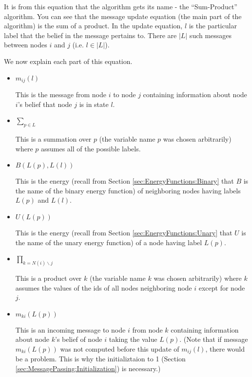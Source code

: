\documentclass[a4paper,10pt]{article}
\begin{document}
It is from this equation that the algorithm gets its name - the ``Sum-Product'' algorithm. You can see that the message update equation (the main part of the algorithm) is the sum of a product. In the update equation, $l$ is the particular label that the belief in the message pertains to. There are $|L|$ such messages between nodes $i$ and $j$ (i.e. $l \in |L|$).

We now explain each part of this equation.

\begin{itemize}
\item 
$  m_{ij}(l)$
  
  This is the message from node $i$ to node $j$ containing information about node $i$'s belief that node $j$ is in state $l$.

\item 
  $  \sum_{p \in L}$

This is a summation over $p$ (the variable name $p$ was chosen arbitrarily) where $p$ assumes all of the possible labels.

\item 
$  B(L(p), L(l))$

This is the energy (recall from Section \ref{sec:EnergyFunctions:Binary} that $B$ is the name of the binary energy function) of neighboring nodes having labels $L(p)$ and $L(l)$.

\item 
  $  U(L(p))$

This is the energy (recall from Section \ref{sec:EnergyFunctions:Unary} that $U$ is the name of the unary energy function) of a node having label $L(p)$.

\item 
  $  \prod_{k=N(i)\backslash j}$

This is a product over $k$ (the variable name $k$ was chosen arbitrarily) where $k$ assumes the values of the ids of all nodes neighboring node $i$ except for node $j$.

\item 
  
  $m_{ki}(L(p))$

This is an incoming message to node $i$ from node $k$ containing information about node $k$'s belief of node $i$ taking the value $L(p)$. (Note that if message $m_{ki}(L(p))$ was not computed before this update of $m_{ij}(l)$, there would be a problem. This is why the initializtaion to 1 (Section \ref{sec:MessagePassing:Initialization}) is necessary.)

\end{itemize}
\end{document}
